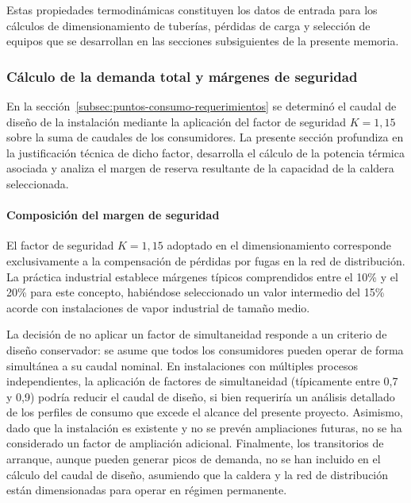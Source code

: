 \documentclass[12pt]{article}
\begin{document}
Estas propiedades termodinámicas constituyen los datos de entrada para los cálculos de dimensionamiento de tuberías, pérdidas de carga y selección de equipos que se desarrollan en las secciones subsiguientes de la presente memoria.


\subsubsection{Cálculo de la demanda total y márgenes de seguridad}
\label{subsubsec:demanda-total-margenes}

En la sección~\ref{subsec:puntos-consumo-requerimientos} se determinó el caudal de diseño de la instalación mediante la aplicación del factor de seguridad $K = 1{,}15$ sobre la suma de caudales de los consumidores. La presente sección profundiza en la justificación técnica de dicho factor, desarrolla el cálculo de la potencia térmica asociada y analiza el margen de reserva resultante de la capacidad de la caldera seleccionada.

\paragraph{Composición del margen de seguridad}

El factor de seguridad $K = 1{,}15$ adoptado en el dimensionamiento corresponde exclusivamente a la compensación de pérdidas por fugas en la red de distribución. La práctica industrial establece márgenes típicos comprendidos entre el 10\% y el 20\% para este concepto, habiéndose seleccionado un valor intermedio del 15\% acorde con instalaciones de vapor industrial de tamaño medio.

La decisión de no aplicar un factor de simultaneidad responde a un criterio de diseño conservador: se asume que todos los consumidores pueden operar de forma simultánea a su caudal nominal. En instalaciones con múltiples procesos independientes, la aplicación de factores de simultaneidad (típicamente entre 0,7 y 0,9) podría reducir el caudal de diseño, si bien requeriría un análisis detallado de los perfiles de consumo que excede el alcance del presente proyecto. Asimismo, dado que la instalación es existente y no se prevén ampliaciones futuras, no se ha considerado un factor de ampliación adicional. Finalmente, los transitorios de arranque, aunque pueden generar picos de demanda, no se han incluido en el cálculo del caudal de diseño, asumiendo que la caldera y la red de distribución están dimensionadas para operar en régimen permanente.
\end{document}
